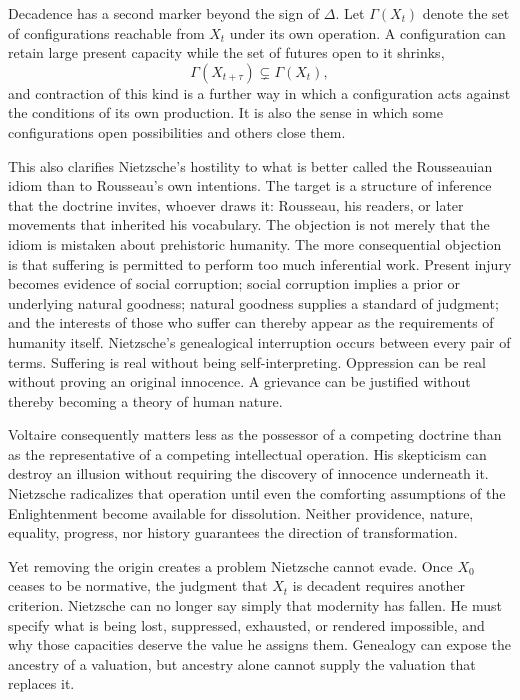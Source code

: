\documentclass[11pt]{article}
\theoremstyle{definition}
\begin{document}
Decadence has a second marker beyond the sign of $\Delta$. Let $\Gamma(X_t)$ denote the set of configurations reachable from $X_t$ under its own operation. A configuration can retain large present capacity while the set of futures open to it shrinks,
\[
\Gamma(X_{t+\tau}) \subsetneq \Gamma(X_t),
\]
and contraction of this kind is a further way in which a configuration acts against the conditions of its own production. It is also the sense in which some configurations open possibilities and others close them.

This also clarifies Nietzsche's hostility to what is better called the Rousseauian idiom than to Rousseau's own intentions. The target is a structure of inference that the doctrine invites, whoever draws it: Rousseau, his readers, or later movements that inherited his vocabulary. The objection is not merely that the idiom is mistaken about prehistoric humanity. The more consequential objection is that suffering is permitted to perform too much inferential work. Present injury becomes evidence of social corruption; social corruption implies a prior or underlying natural goodness; natural goodness supplies a standard of judgment; and the interests of those who suffer can thereby appear as the requirements of humanity itself. Nietzsche's genealogical interruption occurs between every pair of terms. Suffering is real without being self-interpreting. Oppression can be real without proving an original innocence. A grievance can be justified without thereby becoming a theory of human nature.

Voltaire consequently matters less as the possessor of a competing doctrine than as the representative of a competing intellectual operation. His skepticism can destroy an illusion without requiring the discovery of innocence underneath it. Nietzsche radicalizes that operation until even the comforting assumptions of the Enlightenment become available for dissolution. Neither providence, nature, equality, progress, nor history guarantees the direction of transformation.

Yet removing the origin creates a problem Nietzsche cannot evade. Once $X_0$ ceases to be normative, the judgment that $X_t$ is decadent requires another criterion. Nietzsche can no longer say simply that modernity has fallen. He must specify what is being lost, suppressed, exhausted, or rendered impossible, and why those capacities deserve the value he assigns them. Genealogy can expose the ancestry of a valuation, but ancestry alone cannot supply the valuation that replaces it.
\end{document}
